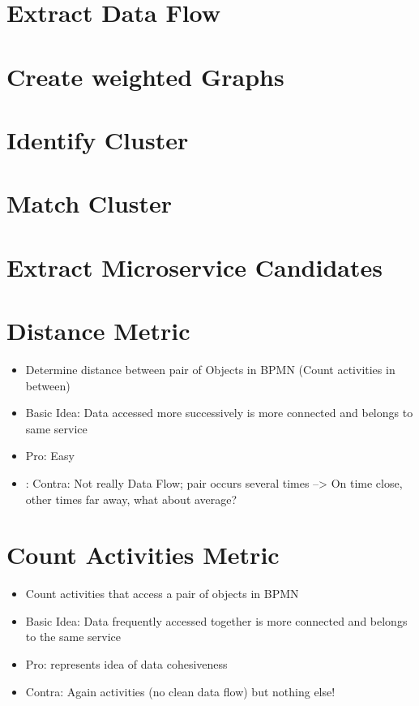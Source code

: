 \section{Extract Data Flow}
\label{sec:Solution:ExtractDataFlow}



\section{Create weighted Graphs}
\label{sec:Solution:CreateGraph}

\section{Identify Cluster}
\label{sec:Solution:IdentifyCluster}

\section{Match Cluster}
\label{sec:Solution:MatchCluster}

\section{Extract Microservice Candidates}
\label{sec:Solution:ExtractMicroserviceCandidates}




\section{Distance Metric}
\begin{itemize}
	\item Determine distance between pair of Objects in BPMN (Count activities in between)
	\item Basic Idea: Data accessed more successively is more connected and belongs to same service
	\item Pro: Easy
	\item: Contra: Not really Data Flow; pair  occurs several times --> On time close, other times far away, what about average?
\end{itemize}

\section{Count Activities Metric}
\begin{itemize}
	\item Count activities that access a pair of objects in BPMN
	\item Basic Idea: Data frequently accessed together is more connected and belongs to the same service
	\item Pro: represents idea of data cohesiveness
	\item Contra: Again activities (no clean data flow) but nothing else!

\end{itemize}





